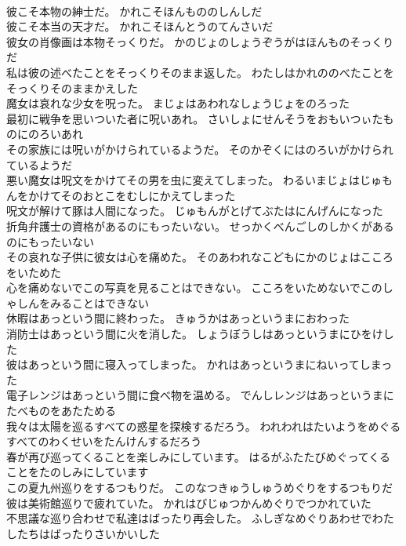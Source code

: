 \documentclass[8pt]{extreport}
\begin{document}
\begin{CJK}{UTF8}{min}
\\	彼こそ本物の紳士だ。	かれこそほんもののしんしだ 
\\	彼こそ本当の天才だ。	かれこそほんとうのてんさいだ 
\\	彼女の肖像画は本物そっくりだ。	かのじょのしょうぞうがはほんものそっくりだ 
\\	私は彼の述べたことをそっくりそのまま返した。	わたしはかれののべたことをそっくりそのままかえした 
\\	魔女は哀れな少女を呪った。	まじょはあわれなしょうじょをのろった 
\\	最初に戦争を思いついた者に呪いあれ。	さいしょにせんそうをおもいつぃたものにのろいあれ 
\\	その家族には呪いがかけられているようだ。	そのかぞくにはのろいがかけられているようだ 
\\	悪い魔女は呪文をかけてその男を虫に変えてしまった。	わるいまじょはじゅもんをかけてそのおとこをむしにかえてしまった 
\\	呪文が解けて豚は人間になった。	じゅもんがとげてぶたはにんげんになった 
\\	折角弁護士の資格があるのにもったいない。	せっかくべんごしのしかくがあるのにもったいない 
\\	その哀れな子供に彼女は心を痛めた。	そのあわれなこどもにかのじょはこころをいためた 
\\	心を痛めないでこの写真を見ることはできない。	こころをいためないでこのしゃしんをみることはできない 
\\	休暇はあっという間に終わった。	きゅうかはあっというまにおわった 
\\	消防士はあっという間に火を消した。	しょうぼうしはあっというまにひをけした 
\\	彼はあっという間に寝入ってしまった。	かれはあっというまにねいってしまった 
\\	電子レンジはあっという間に食べ物を温める。	でんしレンジはあっというまにたべものをあたためる 
\\	我々は太陽を巡るすべての惑星を探検するだろう。	われわれはたいようをめぐるすべてのわくせいをたんけんするだろう 
\\	春が再び巡ってくることを楽しみにしています。	はるがふたたびめぐってくることをたのしみにしています 
\\	この夏九州巡りをするつもりだ。	このなつきゅうしゅうめぐりをするつもりだ 
\\	彼は美術館巡りで疲れていた。	かれはびじゅつかんめぐりでつかれていた 
\\	不思議な巡り合わせで私達はばったり再会した。	ふしぎなめぐりあわせでわたしたちはばったりさいかいした 

\end{CJK}
\end{document}
